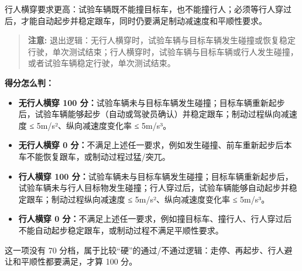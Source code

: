 行人横穿要求更高：试验车辆既不能撞目标车，也不能撞行人；必须等行人穿过后，才能自动起步并稳定跟车，同时仍要满足制动减速度和平顺性要求。

\begin{quote}
  \textbf{注意:} 退出逻辑：无行人横穿时，试验车辆与目标车辆发生碰撞或恢复稳定行驶，单次测试结束；行人横穿时，试验车辆与目标车辆或行人发生碰撞，或者试验车辆稳定行驶，单次测试结束。
\end{quote}

\textbf{得分怎么判：}

\begin{itemize}
  \item \textbf{无行人横穿 100 分：}试验车辆未与目标车辆发生碰撞；目标车辆重新起步后，试验车辆能够起步（自动或驾驶员确认）并稳定跟车；制动过程纵向减速度 ≤ 5m/s²、纵向减速度变化率 ≤ 5m/s³。
  \item \textbf{无行人横穿 0 分：}不满足上述任一要求，例如发生碰撞、前车重新起步后本车不能恢复跟车，或制动过程过猛/突兀。
  \item \textbf{行人横穿 100 分：}试验车辆未与目标车辆发生碰撞；目标车辆重新起步后，试验车辆未与行人目标物发生碰撞；行人穿过后，试验车辆能够自动起步并稳定跟车；制动过程纵向减速度 ≤ 5m/s²、纵向减速度变化率 ≤ 5m/s³。
  \item \textbf{行人横穿 0 分：}不满足上述任一要求，例如撞目标车、撞行人、行人穿过后不能自动起步稳定跟车，或制动过程不满足平顺性要求。
\end{itemize}

这一项没有 70 分档，属于比较“硬”的通过/不通过逻辑：走停、再起步、行人避让和平顺性都要满足，才算 100 分。
